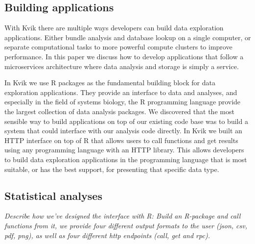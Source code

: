 


\subsection*{Building applications} 

With Kvik there are multiple ways developers can build data
exploration applications. Either bundle analysis and database lookup on a single
computer, or separate computational tasks to more powerful compute clusters to
improve performance. 
In this paper we discuss how to develop applications that follow a
microservices architecture where data analysis and storage is simply a service. 

In Kvik we use R packages as the fundamental building block for data exploration
applications. They provide an interface to data and analyses, and especially in
the field of systems biology, the R programming language provide the largest
collection of data analysis packages. %
We discovered that the most sensible way to build applications on top of our
existing code base was to build a system that could interface with our analysis
code directly. In Kvik we built an HTTP interface on top of R that allows users
to call functions and get results using any programming language with an HTTP
library. This allows developers to build data exploration applications in the
programming language that is most suitable, or has the best support, for
presenting that specific data type. 

\subsection*{Statistical analyses}
\emph{Describe how we've designed the interface with R: Build an R-package and call
functions from it, we provide four different output formats to the user
(json, csv, pdf, png),  as well as four different http endpoints (call, get and
rpc).}

